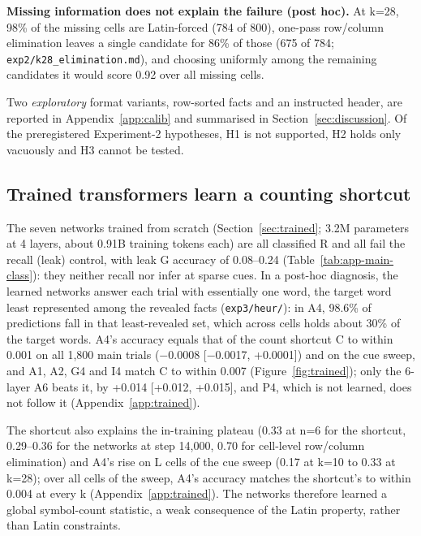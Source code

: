 \documentclass[11pt]{article}
\begin{document}
\textbf{Missing information does not explain the failure (post hoc).} At k=28, 98\% of the missing cells are Latin-forced (784 of 800), one-pass row/column elimination leaves a single candidate for 86\% of those (675 of 784; \texttt{exp2/\allowbreak{}k28\_elimination.md}), and choosing uniformly among the remaining candidates it would score 0.92 over all missing cells.

Two \emph{exploratory} format variants, row-sorted facts and an instructed header, are reported in Appendix~\ref{app:calib} and summarised in Section~\ref{sec:discussion}. Of the preregistered Experiment-2 hypotheses, H1 is not supported, H2 holds only vacuously and H3 cannot be tested.

\subsection{Trained transformers learn a counting shortcut}\label{sec:r-trained}

The seven networks trained from scratch (Section~\ref{sec:trained}; 3.2M parameters at 4 layers, about 0.91B training tokens each) are all classified R and all fail the recall (leak) control, with leak G accuracy of 0.08--0.24 (Table~\ref{tab:app-main-class}): they neither recall nor infer at sparse cues. In a post-hoc diagnosis, the learned networks answer each trial with essentially one word, the target word least represented among the revealed facts (\texttt{exp3/\allowbreak{}heur/\allowbreak{}}): in A4, 98.6\% of predictions fall in that least-revealed set, which across cells holds about 30\% of the target words. A4's accuracy equals that of the count shortcut C to within 0.001 on all 1,800 main trials ($-$0.0008 [$-$0.0017, +0.0001]) and on the cue sweep, and A1, A2, G4 and I4 match C to within 0.007 (Figure~\ref{fig:trained}); only the 6-layer A6 beats it, by +0.014 [+0.012, +0.015], and P4, which is not learned, does not follow it (Appendix~\ref{app:trained}).

The shortcut also explains the in-training plateau (0.33 at n=6 for the shortcut, 0.29--0.36 for the networks at step 14,000, 0.70 for cell-level row/column elimination) and A4's rise on L cells of the cue sweep (0.17 at k=10 to 0.33 at k=28); over all cells of the sweep, A4's accuracy matches the shortcut's to within 0.004 at every k (Appendix~\ref{app:trained}). The networks therefore learned a global symbol-count statistic, a weak consequence of the Latin property, rather than Latin constraints.
\end{document}
